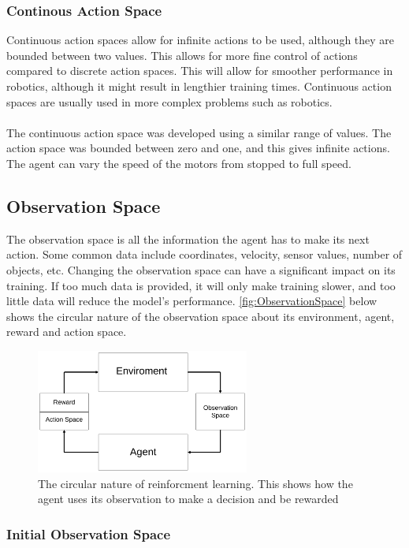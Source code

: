 \documentclass[a4paper,12pt]{article}
\begin{document}
\subsubsection{Continous Action Space}
Continuous action spaces allow for infinite actions to be used, although they are bounded between two values. This allows for more fine control of actions compared to discrete action spaces. This will allow for smoother performance in robotics, although it might result in lengthier training times. Continuous action spaces are usually used in more complex problems such as robotics. 
\\\\
The continuous action space was developed using a similar range of values. The action space was bounded between zero and one, and this gives infinite actions. The agent can vary the speed of the motors from stopped to full speed. 

\subsection{Observation Space}
The observation space is all the information the agent has to make its next action. Some common data include coordinates, velocity, sensor values, number of objects, etc. Changing the observation space can have a significant impact on its training. If too much data is provided, it will only make training slower, and too little data will reduce the model's performance. \autoref{fig:ObservationSpace} below shows the circular nature of the observation space about its environment, agent, reward and action space.

\begin{figure}[H]
\centering
\includegraphics[width=7cm]{imgs/ObservationSpace.png}
\caption{The circular nature of reinforcment learning. This shows how the agent uses its observation to make a decision and be rewarded}
\label{fig:ObservationSpace}
\end{figure}

 

\subsubsection{Initial Observation Space}
\end{document}
